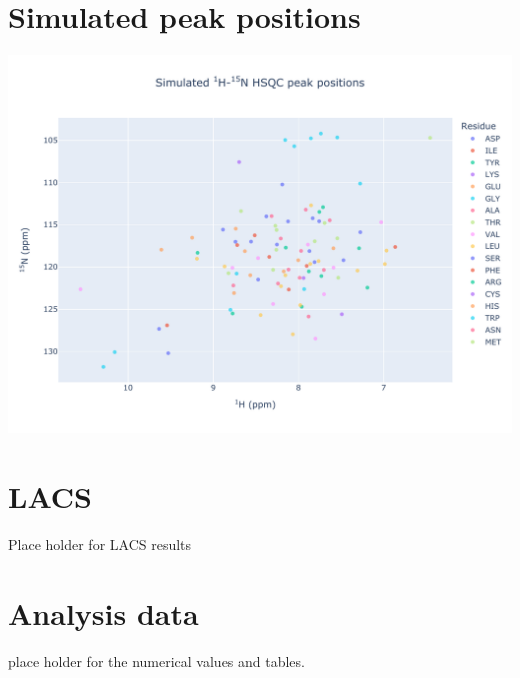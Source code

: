 \section{Simulated peak positions}
\includegraphics[width=18cm]{51294_n15.pdf}\\

\section{LACS}
Place holder for LACS results
\section{Analysis data}
place holder for the numerical values and tables.
